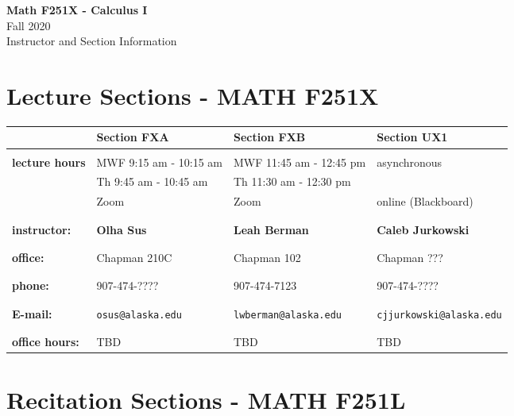 \documentclass[11pt,fleqn]{article}
\begin{document}
\setcounter{secnumdepth}{0}

\vspace*{-1in}
\begin{center}
\large{\textbf{Math F251X - Calculus I}}\\

\large{Fall 2020\\ Instructor and Section Information}
\end{center}

\vfill

\section{Lecture Sections - MATH F251X}

\begin{tabular}{| l || l | l | l |}
\hline \hline
&Section FXA&Section FXB&Section UX1\\
\hline \hline
&&&\\
\textbf{lecture hours}&MWF 9:15 am - 10:15 am&MWF 11:45 am - 12:45 pm& 
asynchronous\\
&Th 9:45 am - 10:45 am& Th 11:30 am - 12:30 pm & \\
&Zoom & Zoom &  online (Blackboard)\\
&&&\\
\hline
&&&\\
\textbf{instructor:}&\textbf{Olha Sus}&\textbf{Leah Berman}&\textbf{Caleb Jurkowski}\\
&&&\\
\hline
&&&\\
\textbf{office:}&Chapman 210C&Chapman 102& Chapman ???\\
&&&\\
\hline
&&&\\
\textbf{phone:}&907-474-????&907-474-7123&907-474-????\\ 
&&&\\\hline
&&&\\
\textbf{E-mail:}&\texttt{osus@alaska.edu} &\texttt{lwberman@alaska.edu} &\texttt{cjjurkowski@alaska.edu}\\ &&&\\ \hline
&&&\\ \textbf{office hours:}&TBD&TBD&TBD\\ 
 \hline
\end{tabular}

\vfill

\section{Recitation Sections - MATH F251L}
\end{document}

